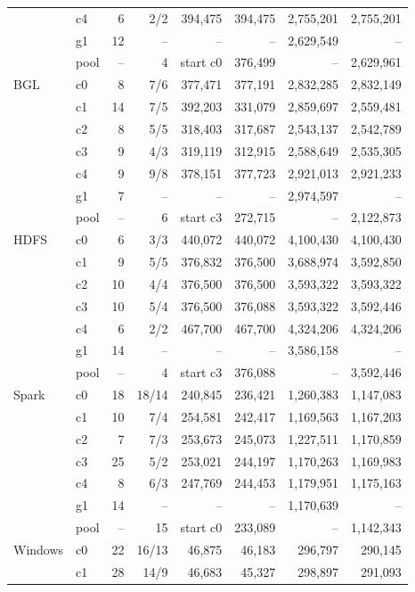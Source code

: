 \begin{longtable}{llrrrrrr}
 & c4 & 6 & 2/2 & 394,475 & 394,475 & 2,755,201 & 2,755,201 \\
 & g1 & 12 & -- & -- & -- & 2,629,549 & -- \\
 & pool & -- & 4 & start c0 & 376,499 & -- & 2,629,961 \\
\midrule
BGL & c0 & 8 & 7/6 & 377,471 & 377,191 & 2,832,285 & 2,832,149 \\
 & c1 & 14 & 7/5 & 392,203 & 331,079 & 2,859,697 & 2,559,481 \\
 & c2 & 8 & 5/5 & 318,403 & 317,687 & 2,543,137 & 2,542,789 \\
 & c3 & 9 & 4/3 & 319,119 & 312,915 & 2,588,649 & 2,535,305 \\
 & c4 & 9 & 9/8 & 378,151 & 377,723 & 2,921,013 & 2,921,233 \\
 & g1 & 7 & -- & -- & -- & 2,974,597 & -- \\
 & pool & -- & 6 & start c3 & 272,715 & -- & 2,122,873 \\
\midrule
HDFS & c0 & 6 & 3/3 & 440,072 & 440,072 & 4,100,430 & 4,100,430 \\
 & c1 & 9 & 5/5 & 376,832 & 376,500 & 3,688,974 & 3,592,850 \\
 & c2 & 10 & 4/4 & 376,500 & 376,500 & 3,593,322 & 3,593,322 \\
 & c3 & 10 & 5/4 & 376,500 & 376,088 & 3,593,322 & 3,592,446 \\
 & c4 & 6 & 2/2 & 467,700 & 467,700 & 4,324,206 & 4,324,206 \\
 & g1 & 14 & -- & -- & -- & 3,586,158 & -- \\
 & pool & -- & 4 & start c3 & 376,088 & -- & 3,592,446 \\
\midrule
Spark & c0 & 18 & 18/14 & 240,845 & 236,421 & 1,260,383 & 1,147,083 \\
 & c1 & 10 & 7/4 & 254,581 & 242,417 & 1,169,563 & 1,167,203 \\
 & c2 & 7 & 7/3 & 253,673 & 245,073 & 1,227,511 & 1,170,859 \\
 & c3 & 25 & 5/2 & 253,021 & 244,197 & 1,170,263 & 1,169,983 \\
 & c4 & 8 & 6/3 & 247,769 & 244,453 & 1,179,951 & 1,175,163 \\
 & g1 & 14 & -- & -- & -- & 1,170,639 & -- \\
 & pool & -- & 15 & start c0 & 233,089 & -- & 1,142,343 \\
\midrule
Windows & c0 & 22 & 16/13 & 46,875 & 46,183 & 296,797 & 290,145 \\
 & c1 & 28 & 14/9 & 46,683 & 45,327 & 298,897 & 291,093 \\

\end{longtable}
